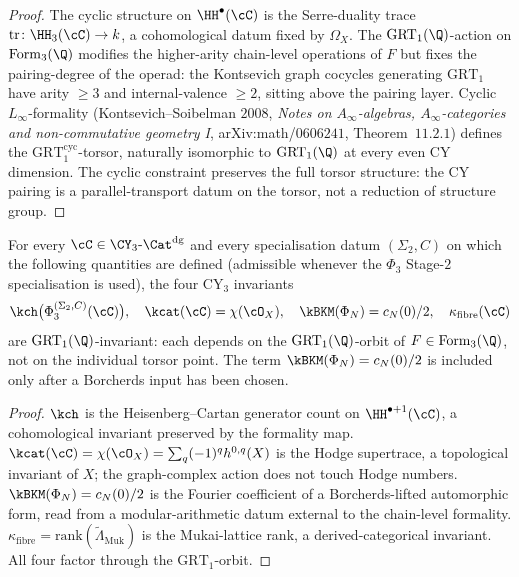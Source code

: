\begin{proof}
The cyclic structure on $\HH^\bullet(\cC)$ is the Serre-duality trace $\mathrm{tr} \colon \HH_3(\cC) \to k$, a cohomological datum fixed by $\Omega_X$. The $\mathrm{GRT}_1(\Q)$-action on $\mathrm{Form}_3(\Q)$ modifies the higher-arity chain-level operations of $F$ but fixes the pairing-degree of the operad: the Kontsevich graph cocycles generating $\mathrm{GRT}_1$ have arity $\geq 3$ and internal-valence $\geq 2$, sitting above the pairing layer. Cyclic $L_\infty$-formality (Kontsevich--Soibelman $2008$, \emph{Notes on $A_\infty$-algebras, $A_\infty$-categories and non-commutative geometry I}, arXiv:math/$0606241$, Theorem~$11.2.1$) defines the $\mathrm{GRT}_1^{\mathrm{cyc}}$-torsor, naturally isomorphic to $\mathrm{GRT}_1(\Q)$ at every even CY dimension. The cyclic constraint preserves the full torsor structure: the CY pairing is a parallel-transport datum on the torsor, not a reduction of structure group.
\end{proof}

\begin{corollary}
\label{cor:cfg-grt1-invariance-kappa}
For every $\cC \in \CY_3\text{-}\Cat^{\mathrm{dg}}$ and every specialisation datum $(\Sigma_2, C)$ on which the following quantities are defined \textup{(}admissible whenever the $\Phi_3$ Stage-$2$ specialisation is used\textup{)}, the four CY$_3$ invariants
\[
 \kch\bigl(\Phi_3^{(\Sigma_2, C)}(\cC)\bigr),
 \quad
 \kcat(\cC) = \chi(\cO_X),
 \quad
 \kBKM(\Phi_N) = c_N(0)/2,
 \quad
 \kappa_{\mathrm{fibre}}(\cC)
\]
are $\mathrm{GRT}_1(\Q)$-invariant: each depends on the $\mathrm{GRT}_1(\Q)$-orbit of $F \in \mathrm{Form}_3(\Q)$, not on the individual torsor point. The term $\kBKM(\Phi_N)=c_N(0)/2$ is included only after a Borcherds input has been chosen.
\end{corollary}

\begin{proof}
$\kch$ is the Heisenberg--Cartan generator count on $\HH^{\bullet + 1}(\cC)$, a cohomological invariant preserved by the formality map. $\kcat(\cC) = \chi(\cO_X) = \sum_q (-1)^q h^{0, q}(X)$ is the Hodge supertrace, a topological invariant of $X$; the graph-complex action does not touch Hodge numbers. $\kBKM(\Phi_N) = c_N(0) / 2$ is the Fourier coefficient of a Borcherds-lifted automorphic form, read from a modular-arithmetic datum external to the chain-level formality. $\kappa_{\mathrm{fibre}} = \mathrm{rank}(\widetilde{\Lambda}_{\mathrm{Muk}})$ is the Mukai-lattice rank, a derived-categorical invariant. All four factor through the $\mathrm{GRT}_1$-orbit.
\end{proof}

